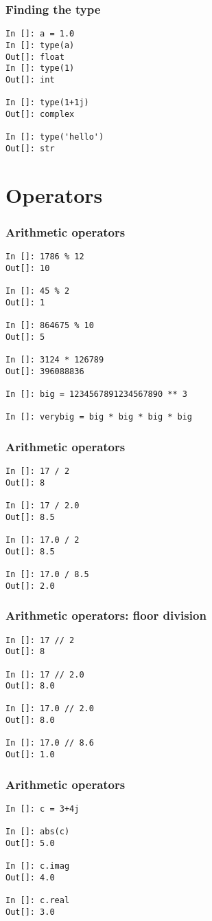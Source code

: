 \documentclass[14pt,compress]{beamer}
\begin{document}
\begin{frame}[fragile]
  \frametitle{Finding the type}
\begin{lstlisting}
In []: a = 1.0
In []: type(a)
Out[]: float
In []: type(1)
Out[]: int

In []: type(1+1j)
Out[]: complex

In []: type('hello')
Out[]: str
\end{lstlisting}
\end{frame}

\section{Operators}

\begin{frame}[fragile]
  \frametitle{Arithmetic operators}
  \small
  \begin{lstlisting}
In []: 1786 % 12
Out[]: 10

In []: 45 % 2
Out[]: 1

In []: 864675 % 10
Out[]: 5

In []: 3124 * 126789
Out[]: 396088836

In []: big = 1234567891234567890 ** 3

In []: verybig = big * big * big * big
  \end{lstlisting}
\end{frame}

\begin{frame}[fragile]
  \frametitle{Arithmetic operators}
  \begin{lstlisting}
In []: 17 / 2
Out[]: 8

In []: 17 / 2.0
Out[]: 8.5

In []: 17.0 / 2
Out[]: 8.5

In []: 17.0 / 8.5
Out[]: 2.0
  \end{lstlisting}
\end{frame}

\begin{frame}[fragile]
  \frametitle{Arithmetic operators: floor division}
  \begin{lstlisting}
In []: 17 // 2
Out[]: 8

In []: 17 // 2.0
Out[]: 8.0

In []: 17.0 // 2.0
Out[]: 8.0

In []: 17.0 // 8.6
Out[]: 1.0
  \end{lstlisting}
\end{frame}


\begin{frame}[fragile]
\frametitle{Arithmetic operators}
  \begin{lstlisting}
In []: c = 3+4j

In []: abs(c)
Out[]: 5.0

In []: c.imag
Out[]: 4.0

In []: c.real
Out[]: 3.0
  \end{lstlisting}
\end{frame}
\end{document}
